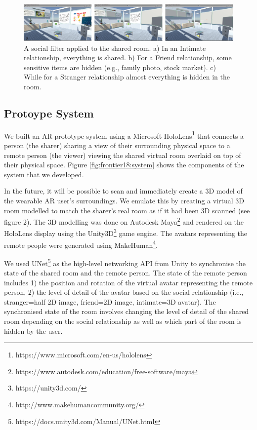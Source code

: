 \begin{figure}
\begin{center}
\includegraphics[width=\linewidth]{images/frontier18/images-02.png}
\caption{A social filter applied to the shared room. a) In an Intimate relationship, everything is shared. b) For a Friend relationship, some sensitive items are hidden (e.g., family photo, stock market). c) While for a Stranger relationship almost everything is hidden in the room.}\label{fig:frontier18:social-filter}
\end{center}
\end{figure}

\subsection{Protoype System}

We built an AR prototype system using a Microsoft HoloLens\footnote{https://www.microsoft.com/en-us/hololens} that connects a person (the sharer) sharing a view of their surrounding physical space to a remote person (the viewer) viewing the shared virtual room overlaid on top of their physical space. Figure \ref{fig:frontier18:system} shows the components of the system that we developed.

In the future, it will be possible to scan and immediately create a 3D model of the wearable AR user's surroundings. We emulate this by creating a virtual 3D room modelled to match the sharer's real room as if it had been 3D scanned (see figure 2).  The 3D modelling was done on Autodesk Maya\footnote{https://www.autodesk.com/education/free-software/maya} and rendered on the HoloLens display using the Unity3D\footnote{https://unity3d.com/} game engine. The avatars representing the remote people were generated using MakeHuman\footnote{http://www.makehumancommunity.org/}.

We used UNet\footnote{https://docs.unity3d.com/Manual/UNet.html} as the high-level networking API from Unity to synchronise the state of the shared room and the remote person. The state of the remote person includes 1) the position and rotation of the virtual avatar representing the remote person, 2) the level of detail of the avatar based on the social relationship (i.e., stranger=half 2D image, friend=2D image, intimate=3D avatar). The synchronised state of the room involves changing the level of detail of the shared room depending on the social relationship as well as which part of the room is hidden by the user. 

